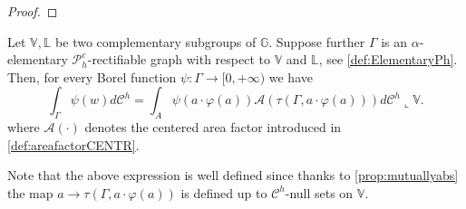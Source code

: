 \documentclass[10pt, a4paper,
oneside, headinclude,footinclude]{scrartcl}
\begin{document}
\begin{proof}
\end{proof}







\begin{teorema}\label{thm:AreaFormulaCENTR}
Let $\mathbb V,\mathbb L$ be two complementary subgroups of $\mathbb G$. Suppose further $\Gamma$ is an $\alpha$-elementary $\mathscr{P}_h^c$-rectifiable graph with respect to $\mathbb{V}$ and $\mathbb{L}$, see \cref{def:ElementaryPh}.
Then, for every Borel function $\psi:\Gamma\to[0,+\infty)$ we have 
\begin{equation}\label{eqn:AreaFormulaCENTR1}
\int_\Gamma \psi(w)d\mathcal{C}^h = \int_A \psi(a\cdot\varphi(a))\mathcal{A}( \tau(\Gamma,a\cdot\varphi(a)))d\mathcal{C}^h\llcorner \mathbb{V}.
\end{equation}
where $\mathcal{A}(\cdot)$ denotes the centered area factor introduced in \cref{def:areafactorCENTR}.
\end{teorema}

\begin{osservazione}
Note that the above expression is well defined since thanks to \cref{prop:mutuallyabs} the map $a\to \tau(\Gamma,a\cdot\varphi(a))$ is defined up to $\mathcal{C}^h$-null sets on $\mathbb{V}$.
\end{osservazione}
\end{document}
